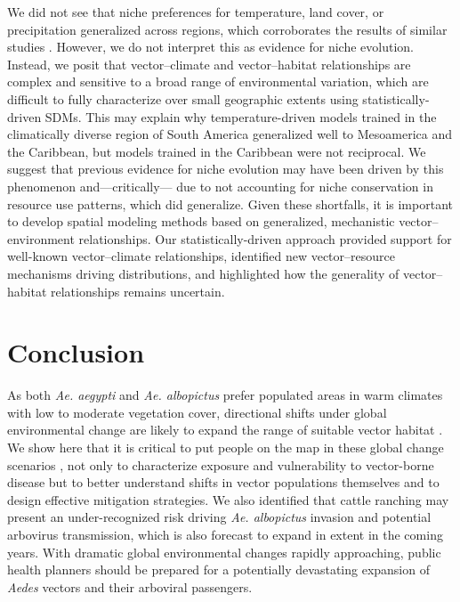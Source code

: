 We did not see that niche preferences for temperature, land cover, or precipitation generalized across regions, which corroborates the results of similar studies \cite{Medley2010-fa, Pech-May2016-vs, Carlson2016-rc}. However, we do not interpret this as evidence for niche evolution. Instead, we posit that vector–climate and vector–habitat relationships are complex and sensitive to a broad range of environmental variation, which are difficult to fully characterize over small geographic extents using statistically-driven SDMs. This may explain why temperature-driven models trained in the climatically diverse region of South America generalized well to Mesoamerica and the Caribbean, but models trained in the Caribbean were not reciprocal. We suggest that previous evidence for niche evolution may have been driven by this phenomenon and—critically— due to not accounting for niche conservation in resource use patterns, which did generalize. Given these shortfalls, it is important to develop spatial modeling methods based on generalized, mechanistic vector–environment relationships. Our statistically-driven approach provided support for well-known vector–climate relationships, identified new vector–resource mechanisms driving distributions, and highlighted how the generality of vector–habitat relationships remains uncertain.

\section{Conclusion}

As both \textit{Ae. aegypti} and \textit{Ae. albopictus} prefer populated areas in warm climates with low to moderate vegetation cover, directional shifts under global environmental change are likely to expand the range of suitable vector habitat \cite{Ryan2019-pz}. We show here that it is critical to put people on the map in these global change scenarios \cite{Ellis2008-xj}, not only to characterize exposure and vulnerability to vector-borne disease but to better understand shifts in vector populations themselves and to design effective mitigation strategies. We also identified that cattle ranching may present an under-recognized risk driving \textit{Ae. albopictus} invasion and potential arbovirus transmission, which is also forecast to expand in extent in the coming years. With dramatic global environmental changes rapidly approaching, public health planners should be prepared for a potentially devastating expansion of \textit{Aedes} vectors and their arboviral passengers.

